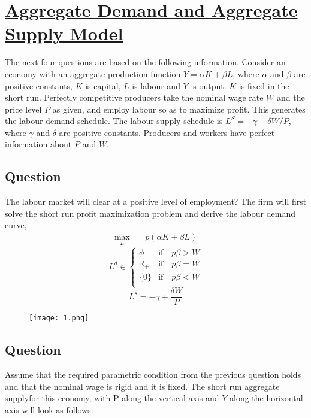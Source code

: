 
\graphicspath{{/Users/econhead/Econschool-notes/Macroeconomics/}}

\section{\underline{Aggregate Demand and Aggregate Supply Model}}
The next four questions are based on the following information. Consider an economy with an aggregate production function \(Y=\alpha K+\beta L\), where \(\alpha\) and \(\beta\) are positive constants, \(K\) is capital, \(L\) is labour and \(Y\) is output. \(K\) is fixed in the short run. Perfectly competitive producers take the nominal wage rate \(W\) and the price level \(P\) as given, and employ labour so as to maximize profit. This generates the labour demand schedule. The labour supply schedule is \(L^S=-\gamma+\delta W / P\), where \(\gamma\) and \(\delta\) are positive constants. Producers and workers have perfect information about \(P\) and \(W\).

\subsection{Question}
The labour  market will clear at a positive level of employment?
The firm will first solve the short run profit maximization problem and derive the labour demand curve,
\begin{align*}
    \max_{L }  & \quad p(\alpha K + \beta L)
  \end{align*}
\[L^d \in \begin{cases}
  \phi & \text{if} \quad p\beta > W\\
  \mathbb{R}_{+} & \text{if} \quad p\beta = W\\
  \{0\} & \text{if} \quad p\beta < W\\
\end{cases}\] 
\[L^s = - \gamma + \frac{\delta W}{P}\] 
\begin{figure}[H]
\centering
\texttt{[image: 1.png]}
\end{figure}
\subsection{Question}
Assume that the required parametric condition from the previous question holds and that the nominal wage is rigid and it is fixed. The short run aggregate supplyfor this economy, with P along the vertical axis and \(Y\) along the horizontal axis will look as follows:


